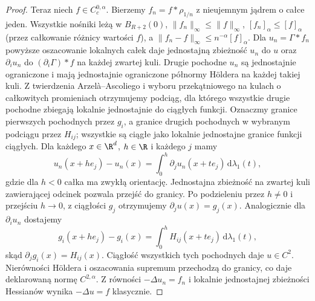 \begin{proof}
Teraz niech $f\in C_c^{0,\alpha}$.
Bierzemy $f_n=f*\rho_{1/n}$ z nieujemnym jądrem
o całce jeden. Wszystkie nośniki leżą w $B_{R+2}(0)$,
$\|f_n\|_\infty\le\|f\|_\infty$,
$[f_n]_\alpha\le[f]_\alpha$ (przez całkowanie
różnicy wartości $f$), a
$\|f_n-f\|_\infty\le n^{-\alpha}[f]_\alpha$.
Dla $u_n=\Gamma*f_n$ powyższe oszacowanie lokalnych
całek daje jednostajną zbieżność $u_n$ do $u$
oraz $\partial_i u_n$ do $(\partial_i\Gamma)*f$
na każdej zwartej kuli. Drugie pochodne $u_n$
są jednostajnie ograniczone i mają jednostajnie
ograniczone półnormy Höldera na każdej takiej kuli.
Z twierdzenia Arzelà--Ascoliego i wyboru przekątniowego
na kulach o całkowitych promieniach otrzymujemy
podciąg, dla którego wszystkie drugie pochodne
zbiegają lokalnie jednostajnie do ciągłych funkcji.
Oznaczmy granice pierwszych pochodnych przez $g_i$,
a granice drugich pochodnych w wybranym podciągu przez
$H_{ij}$; wszystkie są ciągłe jako lokalnie jednostajne
granice funkcji ciągłych. Dla każdego $x\in\R^d$,
$h\in\R$ i każdego $j$ mamy
\[
 u_n(x+he_j)-u_n(x)
 =\int_0^h\partial_j u_n(x+te_j)\,\mathrm d\lambda_1(t),
\]
gdzie dla $h<0$ całka ma zwykłą orientację.
Jednostajna zbieżność na zwartej kuli zawierającej
odcinek pozwala przejść do granicy. Po podzieleniu
przez $h\ne0$ i przejściu $h\to0$, z ciągłości $g_j$
otrzymujemy $\partial_j u(x)=g_j(x)$.
Analogicznie dla $\partial_i u_n$ dostajemy
\[
 g_i(x+he_j)-g_i(x)
 =\int_0^h H_{ij}(x+te_j)\,\mathrm d\lambda_1(t),
\]
skąd $\partial_jg_i(x)=H_{ij}(x)$.
Ciągłość wszystkich tych pochodnych daje $u\in C^2$. Nierówności Höldera
i oszacowania supremum przechodzą do granicy,
co daje deklarowaną normę $C^{2,\alpha}$.
Z równości $-\Delta u_n=f_n$ i lokalnie jednostajnej
zbieżności Hessianów wynika $-\Delta u=f$ klasycznie.
\end{proof}

